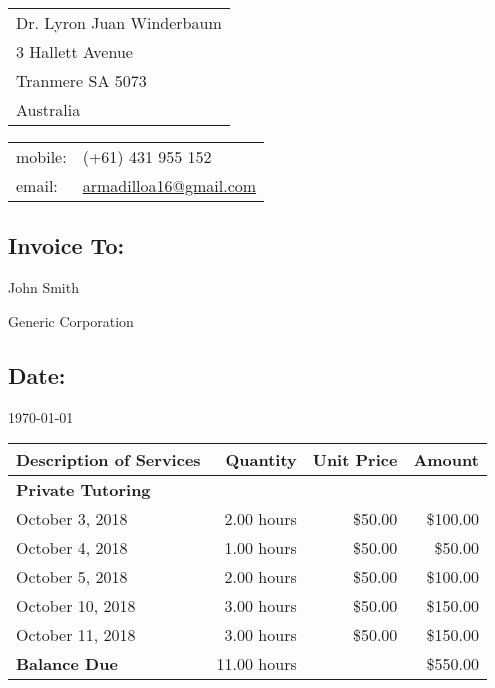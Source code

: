 \documentclass[a4paper,12pt]{report}
\begin{document}
 

\begin{multicols}{2}
\begin{flushleft}
\begin{tabular}{l}
Dr. Lyron Juan Winderbaum \\
3 Hallett Avenue \\  
Tranmere
SA 5073 \\
Australia
\end{tabular}
\end{flushleft}

\begin{flushright}
\begin{tabular}{ll}
mobile: & (+61) 431 955 152 \\
email: & \href{mailto:armadilloa16@gmail.com}{armadilloa16@gmail.com} \\
\end{tabular}
\end{flushright}
\end{multicols}                                  

\subsection*{Invoice To:}

John Smith

Generic Corporation

\subsection*{Date:}

\today

\renewcommand{\arraystretch}{1.4}
\begin{center}
\begin{tabular}{lrrr}
\hline
\textbf{Description of Services} & \textbf{Quantity} & \textbf{Unit Price} & \textbf{Amount} \\ \hline
\textbf{Private Tutoring} & & & \\
October 3, 2018 & 2.00 hours & \$50.00 & \$100.00 \\ 
October 4, 2018 & 1.00 hours & \$50.00 & \$50.00 \\ 
October 5, 2018 & 2.00 hours & \$50.00 & \$100.00 \\ 
October 10, 2018 & 3.00 hours & \$50.00 & \$150.00 \\ 
October 11, 2018 & 3.00 hours & \$50.00 & \$150.00 \\ 

\hline 
\textbf{Balance Due} & 11.00 hours  & & \$550.00 \\
\end{tabular}
\end{center}
\end{document}
